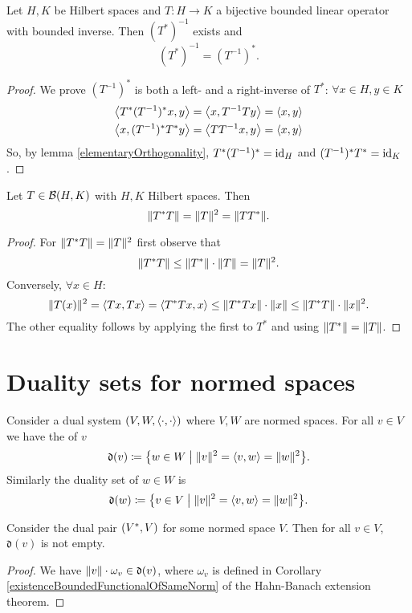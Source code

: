 \begin{proposition}
Let $H,K$ be Hilbert spaces and $T:H\to K$ a bijective bounded linear operator with bounded inverse. Then $(T^*)^{-1}$ exists and
\[ (T^*)^{-1} = (T^{-1})^*. \]
\end{proposition}
\begin{proof}
We prove $(T^{-1})^*$ is both a left- and a right-inverse of $T^*$: $\forall x\in H, y\in K$
\begin{align*}
\left\langle T^*(T^{-1})^*x,y \right\rangle &= \left\langle x,T^{-1}Ty \right\rangle = \left\langle x,y \right\rangle \\
\left\langle x,(T^{-1})^*T^*y \right\rangle &= \left\langle TT^{-1}x,y \right\rangle = \left\langle x,y \right\rangle
\end{align*}
So, by lemma \ref{elementaryOrthogonality}, $T^*(T^{-1})^* = \operatorname{id}_H$ and $(T^{-1})^*T^* = \operatorname{id}_K$.
\end{proof}

\begin{proposition} \label{normOfSquare}
Let $T\in \operatorname{\mathcal{B}}(H,K)$ with $H,K$ Hilbert spaces. Then
\[ \lVert T^*T\rVert= \lVert T\rVert^2 = \lVert TT^*\rVert. \]
\end{proposition}
\begin{proof}
For $\lVert T^*T\rVert= \lVert T\rVert^2$ first observe that
\[ \lVert T^*T\rVert \leq \lVert T^*\rVert\cdot\lVert T\rVert = \lVert T\rVert^2. \]
Conversely, $\forall x\in H$:
\[ \lVert T(x)\rVert^2 = \left\langle Tx,Tx \right\rangle = \left\langle T^*Tx,x \right\rangle \leq \lVert T^*Tx\rVert\cdot \lVert x\rVert \leq \lVert T^*T\rVert\cdot\lVert x\rVert^2. \]
The other equality follows by applying the first to $T^*$ and using $\lVert T^*\rVert=\lVert T\rVert$.
\end{proof}

\section{Duality sets for normed spaces}
\begin{definition}
Consider a dual system $\sSet{V, W, \pair{\cdot,\cdot}}$ where $V,W$ are normed spaces. For all $v\in V$ we have the  of $v$
\[ \mathfrak{d}(v) \defeq \setbuilder{w\in W}{\norm{v}^2 = \pair{v,w} = \norm{w}^2}. \]
Similarly the duality set of $w\in W$ is
\[ \mathfrak{d}(w) \defeq \setbuilder{v\in V}{\norm{v}^2 = \pair{v,w} = \norm{w}^2}. \]
\end{definition}

\begin{proposition}
Consider the dual pair $\sSet{V^*, V}$ for some normed space $V$. Then for all $v\in V$, $\mathfrak{d}(v)$ is not empty.
\end{proposition}
\begin{proof}
We have $\lVert v\rVert\cdot \omega_v\in \mathfrak{d}(v)$, where $\omega_v$ is defined in Corollary \ref{existenceBoundedFunctionalOfSameNorm} of the Hahn-Banach extension theorem.
\end{proof}

